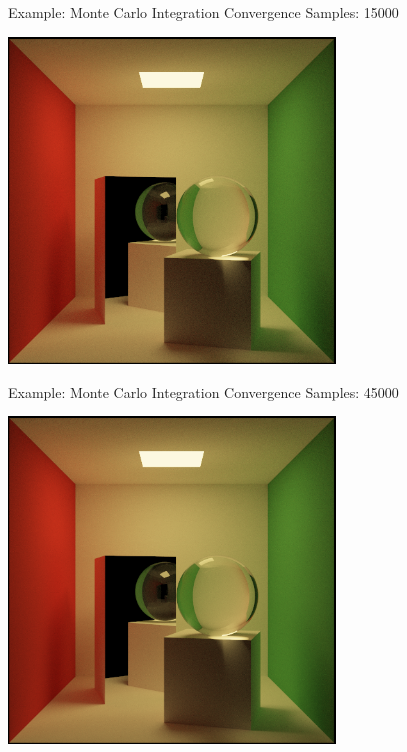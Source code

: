 \documentclass{beamer}
\begin{document}
\begin{frame}{Example: Monte Carlo Integration Convergence}
    Samples: 15000
    \begin{center}
        \includegraphics[width=0.65\textwidth]{../img/convergence/cornell-15000.png}
    \end{center}
\end{frame}

\begin{frame}{Example: Monte Carlo Integration Convergence}
    Samples: 45000
    \begin{center}
        \includegraphics[width=0.65\textwidth]{../img/convergence/cornell-45000.png}
    \end{center}
\end{frame}
\end{document}
